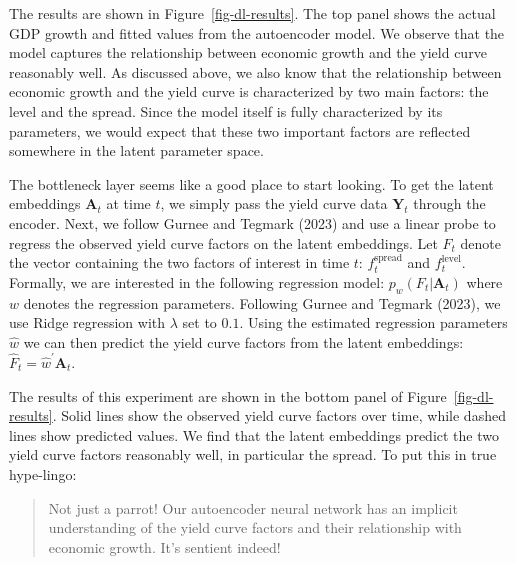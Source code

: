 \documentclass{article}
\theoremstyle{plain}
\theoremstyle{definition}
\theoremstyle{remark}
\begin{document}
The results are shown in Figure~\ref{fig-dl-results}. The top panel
shows the actual GDP growth and fitted values from the autoencoder
model. We observe that the model captures the relationship between
economic growth and the yield curve reasonably well. As discussed above,
we also know that the relationship between economic growth and the yield
curve is characterized by two main factors: the level and the spread.
Since the model itself is fully characterized by its parameters, we
would expect that these two important factors are reflected somewhere in
the latent parameter space.

The bottleneck layer seems like a good place to start looking. To get
the latent embeddings \(\mathbf{A}_t\) at time \(t\), we simply pass the
yield curve data \(\mathbf{Y}_t\) through the encoder. Next, we follow
Gurnee and Tegmark (2023) and use a linear probe to regress the observed
yield curve factors on the latent embeddings. Let \(F_t\) denote the
vector containing the two factors of interest in time \(t\):
\(f_t^{\text{spread}}\) and \(f_t^{\text{level}}\). Formally, we are
interested in the following regression model:
\(p_{w}(F_t|\mathbf{A}_t)\) where \(w\) denotes the regression
parameters. Following Gurnee and Tegmark (2023), we use Ridge regression
with \(\lambda\) set to \(0.1\). Using the estimated regression
parameters \(\hat{w}\) we can then predict the yield curve factors from
the latent embeddings: \(\hat{F}_t=\hat{w}^{\prime}\mathbf{A}_t\).

The results of this experiment are shown in the bottom panel of
Figure~\ref{fig-dl-results}. Solid lines show the observed yield curve
factors over time, while dashed lines show predicted values. We find
that the latent embeddings predict the two yield curve factors
reasonably well, in particular the spread. To put this in true
hype-lingo:

\begin{quote}
Not just a parrot! Our autoencoder neural network has an implicit
understanding of the yield curve factors and their relationship with
economic growth. It's sentient indeed!
\end{quote}
\end{document}
